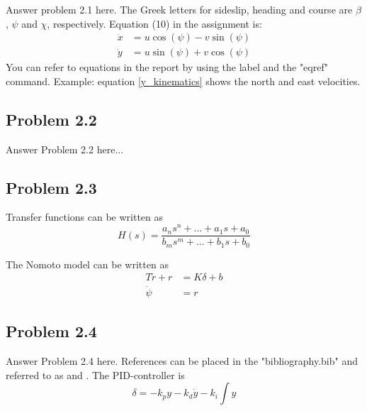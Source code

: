 Answer problem 2.1 here. The Greek letters for sideslip, heading and course are $\beta$, $\psi$ and $\chi$, respectively. Equation (10) in the assignment is:
\begin{equation}
\label{y_kinematics}
	\begin{aligned}
		\dot{x} &= u \cos (\psi) -v \sin (\psi) \\
		\dot{y} &= u \sin (\psi) + v \cos (\psi)
	\end{aligned}
\end{equation} 
You can refer to equations in the report by using the label and the "eqref" command. Example: equation \eqref{y_kinematics} shows the north and east velocities. 

\subsection*{Problem 2.2}
Answer Problem 2.2 here...

\subsection*{Problem 2.3}
Transfer functions can be written as
\begin{equation}
	H(s) = \frac{a_n s^n + ... + a_1 s + a_0}{b_m s^m + ... + b_1 s + b_0}
\end{equation}

The Nomoto model can be written as
\begin{equation}
\label{eq:nomoto}
	\begin{aligned}
		T \dot{r} + r &= K \delta + b \\
		\dot{\psi} &= r
	\end{aligned}
\end{equation}

\subsection*{Problem 2.4}
Answer Problem 2.4 here.  References can be placed in the "bibliography.bib" and referred to as \cite{Fossen2011} and \cite{Fjellstad1994857}. The PID-controller is
\begin{equation}
	\delta = -k_p y - k_d \dot{y} - k_i \int y
\end{equation}

